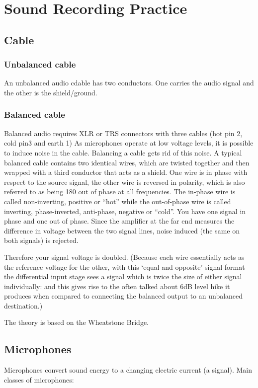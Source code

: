 
\chapter{Sound Recording Practice}
\label{examples}

\section{Cable}
\subsection{Unbalanced cable}
An unbalanced audio cdable has two conductors. One carries the audio signal and the other is the shield/ground. 

\subsection{Balanced cable}
Balanced audio requires XLR or TRS connectors with three cables (hot pin 2, cold pin3 and earth 1)
As microphones operate at low voltage levels, it is possible to induce noise in the cable. Balancing a cable gets rid of this noise. A typical balanced cable contains two identical wires, which are twisted together and then wrapped with a third conductor that acts as a shield. One wire is in phase with respect to the source signal, the other wire is reversed in polarity, which is also referred to as being 180 out of phase at all frequencies. The in-phase wire is called non-inverting, positive or ``hot'' while the out-of-phase wire is called inverting, phase-inverted, anti-phase, negative or ``cold''. You have one signal in phase and one out of phase. Since the amplifier at the far end measures the difference in voltage between the two signal lines, noise induced (the same on both signals) is rejected.
 
Therefore your signal voltage is doubled. (Because each wire essentially acts as the reference voltage for the other, with this `equal and opposite' signal format the differential input stage sees a signal which is twice the size of either signal individually: and this gives rise to the often talked about 6dB level hike it produces when compared to connecting the balanced output to an unbalanced destination.)

The theory is based on the Wheatstone Bridge.

\section{Microphones}
Microphones convert sound energy to a changing electric current (a signal).
Main classes of microphones:
